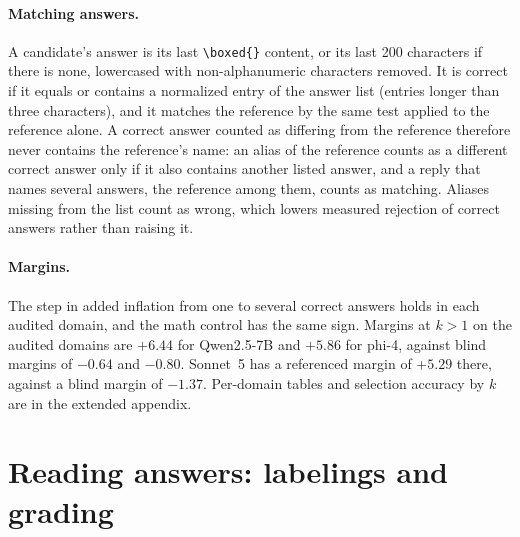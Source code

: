 \paragraph{Matching answers.} A candidate's answer is its last \texttt{\textbackslash boxed\{\}} content, or its last 200 characters if there is none, lowercased with non-alphanumeric characters removed. It is correct if it equals or contains a normalized entry of the answer list (entries longer than three characters), and it matches the reference by the same test applied to the reference alone. A correct answer counted as differing from the reference therefore never contains the reference's name: an alias of the reference counts as a different correct answer only if it also contains another listed answer, and a reply that names several answers, the reference among them, counts as matching. Aliases missing from the list count as wrong, which lowers measured rejection of correct answers rather than raising it.

\paragraph{Margins.} The step in added inflation from one to several correct answers holds in each audited domain, and the math control has the same sign.\pre{} Margins at $k{>}1$ on the audited domains are $+6.44$ for Qwen2.5-7B and $+5.86$ for phi-4, against blind margins of $-0.64$ and $-0.80$. Sonnet~5 has a referenced margin of $+5.29$ there, against a blind margin of $-1.37$. Per-domain tables and selection accuracy by $k$ are in the extended appendix.

\FloatBarrier
\section{Reading answers: labelings and grading}
\label{app:grid}

